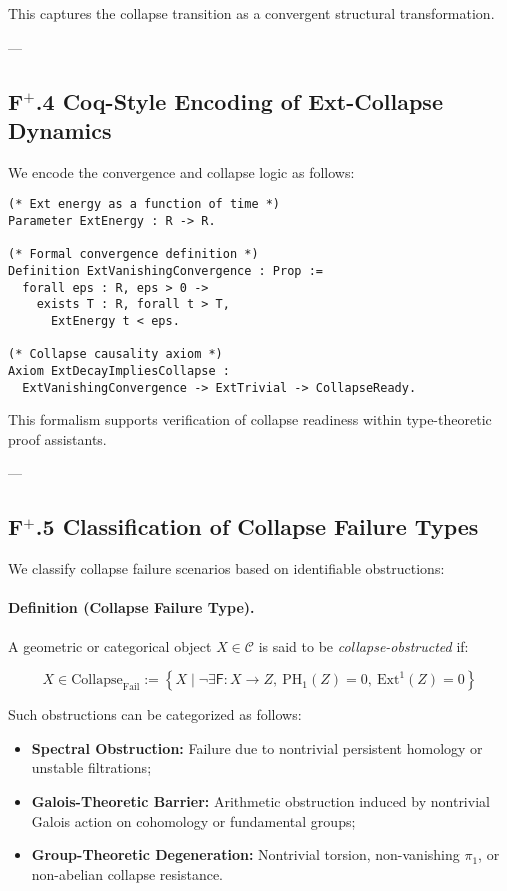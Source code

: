 \documentclass[11pt]{article}
\begin{document}
This captures the collapse transition as a convergent structural transformation.

---

\subsection*{F$^{+}$.4 Coq-Style Encoding of Ext-Collapse Dynamics}

We encode the convergence and collapse logic as follows:

\begin{lstlisting}[language=Coq]
(* Ext energy as a function of time *)
Parameter ExtEnergy : R -> R.

(* Formal convergence definition *)
Definition ExtVanishingConvergence : Prop :=
  forall eps : R, eps > 0 ->
    exists T : R, forall t > T,
      ExtEnergy t < eps.

(* Collapse causality axiom *)
Axiom ExtDecayImpliesCollapse :
  ExtVanishingConvergence -> ExtTrivial -> CollapseReady.
\end{lstlisting}

This formalism supports verification of collapse readiness within type-theoretic proof assistants.

---

\subsection*{F$^{+}$.5 Classification of Collapse Failure Types}

We classify collapse failure scenarios based on identifiable obstructions:

\paragraph{Definition (Collapse Failure Type).}
A geometric or categorical object \( X \in \mathcal{C} \) is said to be \emph{collapse-obstructed} if:

\[
X \in \mathrm{Collapse}_{\mathrm{Fail}} := \left\{ X \mid \neg \exists \mathsf{F} : X \rightarrow Z,\ \mathrm{PH}_1(Z) = 0,\ \mathrm{Ext}^1(Z) = 0 \right\}
\]

Such obstructions can be categorized as follows:

\begin{itemize}
    \item \textbf{Spectral Obstruction:} Failure due to nontrivial persistent homology or unstable filtrations;
    \item \textbf{Galois-Theoretic Barrier:} Arithmetic obstruction induced by nontrivial Galois action on cohomology or fundamental groups;
    \item \textbf{Group-Theoretic Degeneration:} Nontrivial torsion, non-vanishing \( \pi_1 \), or non-abelian collapse resistance.
\end{itemize}
\end{document}
